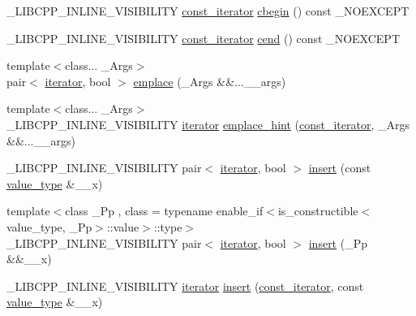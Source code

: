 \begin{DoxyCompactItemize}
\item 
\+\_\+\+L\+I\+B\+C\+P\+P\+\_\+\+I\+N\+L\+I\+N\+E\+\_\+\+V\+I\+S\+I\+B\+I\+L\+I\+T\+Y \hyperlink{class__map_ab0513968c2610ccf3b3fe070184396aa}{const\+\_\+iterator} \hyperlink{class__map_acc42636721e48f59874a17a15c589040}{cbegin} () const \+\_\+\+N\+O\+E\+X\+C\+E\+P\+T
\item 
\+\_\+\+L\+I\+B\+C\+P\+P\+\_\+\+I\+N\+L\+I\+N\+E\+\_\+\+V\+I\+S\+I\+B\+I\+L\+I\+T\+Y \hyperlink{class__map_ab0513968c2610ccf3b3fe070184396aa}{const\+\_\+iterator} \hyperlink{class__map_a01c6193aa9daba5a58b59ce4e0fd382b}{cend} () const \+\_\+\+N\+O\+E\+X\+C\+E\+P\+T
\item 
{\footnotesize template$<$class... \+\_\+\+Args$>$ }\\pair$<$ \hyperlink{class__map_a9ed817d33532f34fc46649b3fbe8e612}{iterator}, bool $>$ \hyperlink{class__map_a2d948d2dd688470fd96b0e6467301816}{emplace} (\+\_\+\+Args \&\&...\+\_\+\+\_\+args)
\item 
{\footnotesize template$<$class... \+\_\+\+Args$>$ }\\\+\_\+\+L\+I\+B\+C\+P\+P\+\_\+\+I\+N\+L\+I\+N\+E\+\_\+\+V\+I\+S\+I\+B\+I\+L\+I\+T\+Y \hyperlink{class__map_a9ed817d33532f34fc46649b3fbe8e612}{iterator} \hyperlink{class__map_aaff98a5f2652c07e9a85e838cb22a57d}{emplace\+\_\+hint} (\hyperlink{class__map_ab0513968c2610ccf3b3fe070184396aa}{const\+\_\+iterator}, \+\_\+\+Args \&\&...\+\_\+\+\_\+args)
\item 
\+\_\+\+L\+I\+B\+C\+P\+P\+\_\+\+I\+N\+L\+I\+N\+E\+\_\+\+V\+I\+S\+I\+B\+I\+L\+I\+T\+Y pair$<$ \hyperlink{class__map_a9ed817d33532f34fc46649b3fbe8e612}{iterator}, bool $>$ \hyperlink{class__map_a6d9694daa6ede1cacc3eb02ce5ce5dd3}{insert} (const \hyperlink{class__map_a840dcfbf8726d7ecdd0298ffc6afde52}{value\+\_\+type} \&\+\_\+\+\_\+x)
\item 
{\footnotesize template$<$class \+\_\+\+Pp , class  = typename enable\+\_\+if$<$is\+\_\+constructible$<$value\+\_\+type, \+\_\+\+Pp$>$\+::value$>$\+::type$>$ }\\\+\_\+\+L\+I\+B\+C\+P\+P\+\_\+\+I\+N\+L\+I\+N\+E\+\_\+\+V\+I\+S\+I\+B\+I\+L\+I\+T\+Y pair$<$ \hyperlink{class__map_a9ed817d33532f34fc46649b3fbe8e612}{iterator}, bool $>$ \hyperlink{class__map_a5060f65b29685f3b39eeadf3d9214c7e}{insert} (\+\_\+\+Pp \&\&\+\_\+\+\_\+x)
\item 
\+\_\+\+L\+I\+B\+C\+P\+P\+\_\+\+I\+N\+L\+I\+N\+E\+\_\+\+V\+I\+S\+I\+B\+I\+L\+I\+T\+Y \hyperlink{class__map_a9ed817d33532f34fc46649b3fbe8e612}{iterator} \hyperlink{class__map_a15817f1b287de91a92cb554e8b968833}{insert} (\hyperlink{class__map_ab0513968c2610ccf3b3fe070184396aa}{const\+\_\+iterator}, const \hyperlink{class__map_a840dcfbf8726d7ecdd0298ffc6afde52}{value\+\_\+type} \&\+\_\+\+\_\+x)

\end{DoxyCompactItemize}
